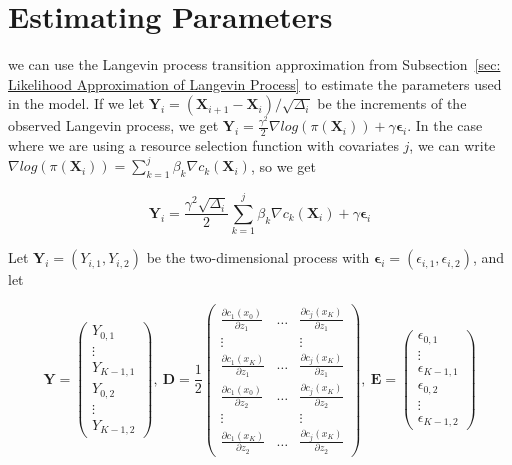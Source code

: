 \section{Estimating Parameters}
\label{sec: estimating parameters}
we can use the Langevin process transition approximation from Subsection~\ref{sec: Likelihood Approximation of Langevin Process} to estimate the parameters used in the model. If we let $\textbf{Y}_i = (\textbf{X}_{i+1} - \textbf{X}_i)/\sqrt{\Delta_i}$ be the increments of the observed Langevin process, we get $\textbf{Y}_i = \frac{\gamma^2}{2}\nabla log(\pi(\textbf{X}_i)) + \gamma \bm \epsilon_i$. In the case where we are using a resource selection function with covariates $j$, we can write $\nabla log(\pi(\textbf{X}_i)) = \sum_{k = 1}^j \beta_k \nabla c_k(\textbf{X}_i)$, so we get

$$
    \textbf{Y}_i = \frac{\gamma^2 \sqrt{\Delta_i}}{2}\sum_{k = 1}^j \beta_k \nabla c_k(\textbf{X}_i) + \gamma \bm \epsilon_i
$$

Let $\textbf{Y}_i = (Y_{i,1}, Y_{i,2})$ be the two-dimensional process with $\bm \epsilon_i =(\epsilon_{i,1}, \epsilon_{i,2})$, and let

$$
    \mathbf{Y} = \begin{pmatrix}
        Y_{0,1} \\
        \vdots \\
        Y_{K-1,1}\\
        Y_{0,2}\\
        \vdots\\
        Y_{K-1,2}
    \end{pmatrix} , \    
    \mathbf{D} = \frac{1}{2} 
    \begin{pmatrix}
        \frac{\partial c_1(x_0)}{\partial z_1} & \dots & \frac{\partial c_j(x_K)}{\partial z_1} \\
        \vdots & & \vdots \\
        \frac{\partial c_1(x_K)}{\partial z_1} & \dots & \frac{\partial c_j(x_K)}{\partial z_1} \\
        \frac{\partial c_1(x_0)}{\partial z_2} & \dots & \frac{\partial c_j(x_K)}{\partial z_2} \\
        \vdots & & \vdots \\
        \frac{\partial c_1(x_K)}{\partial z_2} & \dots & \frac{\partial c_j(x_K)}{\partial z_2}
    \end{pmatrix} , \
    \mathbf{E} =\begin{pmatrix}
        \epsilon_{0,1} \\
        \vdots \\
        \epsilon_{K-1,1}\\
        \epsilon_{0,2}\\
        \vdots\\
        \epsilon_{K-1,2}
    \end{pmatrix}
$$


